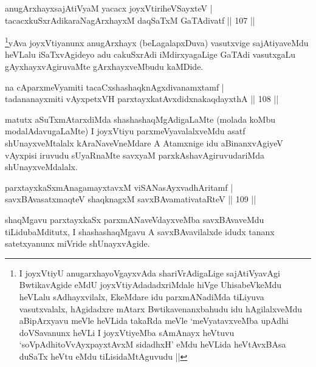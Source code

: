 \begin{shl}
anugArxhayxsajAtiVyaM yacacx joyxVtiriheVSayxteV |  \\
tacacxkuSxrAdikaraNagArxhayxM daqSaTxM GaTAdivatf \hfill||  107 ||  
\end{shl}

\begin{artha}
\footnote{I joyxVtiyU anugarxhayoVgayxvAda shariVrAdigaLige sajAtiVyavAgi BwtikavAgide eMdU joyxVtiyAdadadxriMdale hiVge UhisabeVkeMdu heVLalu sAdhayxvilalx, EkeMdare idu parxmANadiMda tiLiyuva vasutxvalalx, hAgidadxre mAtarx Bwtikavenanxbahudu idu hAgilalxveMdu aBipArxyavu meVle heVLida takaRda meVle `meVyatavxveMba upAdhi doVSavanunx heVLi I joyxVtiyeMba sAmAnayx heVtuvu `soVpAdhitoVvAyxpayxtAvxM sidadhxH' eMdu heVLida heVtAvxBAsa duSaTx heVtu eMdu tiLisidaMtAguvudu ||}yAva joyxVtiyanunx anugArxhayx (beLagalapxDuva) vasutxvige sajAtiyaveMdu heVLalu iSaTxvAgideyo adu cakuSxrAdi iMdirxyagaLige GaTAdi vasutxgaLu gAyxhayxvAgiruvaMte gArxhayxveMbudu kaMDide.
\end{artha}

\begin{shl}
na cAparxmeVyamiti tacaCxshashaqknAgxdivanamxtamf |  \\
tadananayxmiti vAyxpetxVH parxtayxkatAvxdidxnakaqdayxthA \hfill||  108 ||  
\end{shl}

\begin{artha}
matutx aSuTxmAtarxdiMda shashashaqMgAdigaLaMte (molada koMbu modalAdavugaLaMte) I joyxVtiyu parxmeVyavalalxveMdu asatf shUnayxveMtalalx kAraNaveVneMdare A Atamxnige idu aBinanxvAgiyeV vAyxpisi iruvudu sUyaRnaMte savxyaM parxkAshavAgiruvudariMda shUnayxveMdalalx.
\end{artha}


\begin{shl}
parxtayxkaSxmAnagamayxtavxM viSANasAyxvadhAritamf | \\
savxBAvasatxmaqteV shaqknagxM savxBAvamativataRteV \hfill||  109 ||  
\end{shl}

\begin{artha}
shaqMgavu parxtayxkaSx parxmANaveVdayxveMba savxBAvaveMdu tiLidubaMditutx, I shashashaqMgavu A savxBAvavilalxde idudx tananx satetxyanunx miVride shUnayxvAgide.
\end{artha}

